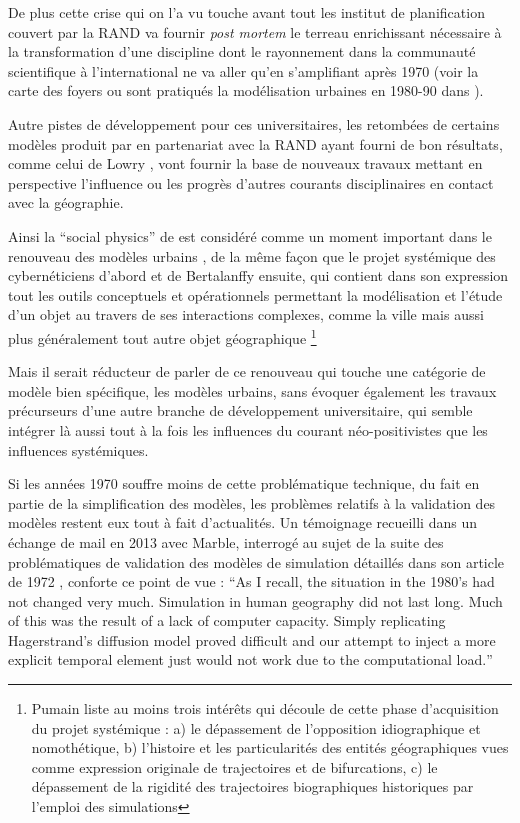 {De plus cette crise qui on l'a vu touche avant tout les institut de planification couvert par la RAND va fournir \textit{post mortem} le terreau enrichissant nécessaire à la transformation d'une discipline dont le rayonnement dans la communauté scientifique à l'international ne va aller qu'en s'amplifiant après 1970 (voir la carte des foyers ou sont pratiqués la modélisation urbaines en 1980-90 dans \autocite{Wegener1994}).

Autre pistes de développement pour ces universitaires, les retombées de certains modèles produit par en partenariat avec la RAND ayant fourni de bon résultats, comme celui de Lowry \autocite {Lowry1964}, vont fournir la base de nouveaux travaux mettant en perspective l'influence ou les progrès d'autres courants disciplinaires en contact avec la géographie. 

Ainsi la \foreignquote{english}{social physics} de \autocite{Wilson1970} est considéré comme un moment important dans le renouveau des modèles urbains \autocite{Griffith2010}, de la même façon que le projet systémique des cybernéticiens d'abord et de Bertalanffy ensuite, qui contient dans son expression tout les outils conceptuels et opérationnels permettant la modélisation et l'étude d'un objet au travers de ses interactions complexes, comme la ville \autocite{Forrester1969} \autocite[11]{Batty1976, Batty2001} mais aussi plus généralement tout autre objet géographique \autocite[27-28]{Pumain2003} \footnote{ Pumain liste au moins trois intérêts qui découle de cette phase d'acquisition du projet systémique : a) le dépassement de l'opposition idiographique et nomothétique, b) l'histoire et les particularités des entités géographiques vues comme expression originale de trajectoires et de bifurcations, c) le dépassement de la rigidité des trajectoires biographiques historiques par l'emploi des simulations}

Mais il serait réducteur de parler de ce renouveau qui touche une catégorie de modèle bien spécifique, les modèles urbains, sans évoquer également les travaux précurseurs d'une autre branche de développement universitaire, qui semble intégrer là aussi tout à la fois les influences du courant néo-positivistes que les influences systémiques. %

Si les années 1970 souffre moins de cette problématique technique, du fait en partie de la simplification des modèles, les problèmes relatifs à la validation des modèles restent eux tout à fait d'actualités. Un témoignage recueilli dans un échange de mail en 2013 avec Marble, interrogé au sujet de la suite des problématiques de validation des modèles de simulation détaillés dans son article de 1972 \autocite{Marble1972}, conforte ce point de vue : \foreignquote{english}{As I recall, the situation in the 1980's had not changed very much. Simulation in human geography did not last long. Much of this was the result of a lack of computer capacity. Simply replicating Hagerstrand's diffusion model proved difficult and our attempt to inject a more explicit temporal element just would not work due to the computational load.}

}
